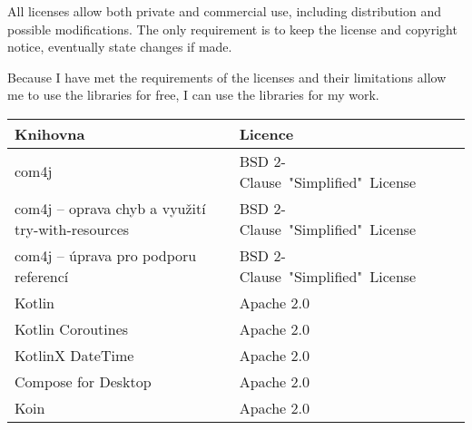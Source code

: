 All licenses allow both private and commercial use, including distribution and possible modifications.
The only requirement is to keep the license and copyright notice, eventually state changes if made.


Because I have met the requirements of the licenses and their limitations allow me to use the libraries for free, I can use the libraries for my work.

\begin{table}[hbt!]
    \centering
    \captionsetup{justification=centering}
    \begin{tabular}{|l|l|l|}
        \hline
        \textbf{Knihovna}                                 & \textbf{Licence}                                                                                                          \\ \hline
        com4j                                             & BSD 2-Clause\ "Simplified"\ License\tablefootnote{\url{https://github.com/kohsuke/com4j/blob/master/LICENSE.txt}}         \\ \hline
        com4j -- oprava chyb a využití try-with-resources & BSD 2-Clause\ "Simplified"\ License\tablefootnote{\url{https://github.com/archiecobbs/com4j/blob/master/LICENSE.txt}}     \\ \hline
        com4j -- úprava pro podporu referencí             & BSD 2-Clause\ "Simplified"\ License\tablefootnote{\url{https://github.com/jasperkrijgsman/com4j/blob/master/LICENSE.txt}} \\ \hline
        Kotlin                                            & Apache 2.0\tablefootnote{\url{https://github.com/JetBrains/kotlin/blob/master/license/README.md}}                         \\ \hline
        Kotlin Coroutines                                 & Apache 2.0\tablefootnote{\url{https://github.com/Kotlin/kotlinx.coroutines/blob/master/LICENSE.txt}}                      \\ \hline
        KotlinX DateTime                                  & Apache 2.0\tablefootnote{\url{https://github.com/Kotlin/kotlinx-datetime/blob/master/LICENSE.txt}}                        \\ \hline
        Compose for Desktop                               & Apache 2.0\tablefootnote{\url{https://github.com/JetBrains/compose-jb/blob/master/LICENSE.txt}}                           \\ \hline
        Koin                                              & Apache 2.0\tablefootnote{\url{https://github.com/InsertKoinIO/koin/blob/master/LICENSE}}                                  \\ \hline

\end{tabular}
\end{table}
